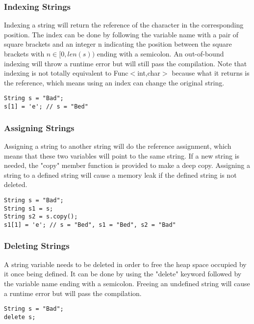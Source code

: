 \subsubsection{Indexing Strings}
Indexing a string will return the reference of the character in the corresponding position. The index can be done by following the variable name with a pair of square brackets and an integer n indicating the position between the square brackets with $n \in [0, len(s))$ ending with a semicolon. An out-of-bound indexing will throw a runtime error but will still pass the compilation. Note that indexing is not totally equivalent to Func$<$int,char$>$ because what it returns is the reference, which means using an index can change the original string.
\begin{lstlisting}[caption={indexing\_string.csm}, captionpos=b]
String s = "Bad";
s[1] = 'e'; // s = "Bed"
\end{lstlisting}
\subsubsection{Assigning Strings}
Assigning a string to another string will do the reference assignment, which means that these two variables will point to the same string. If a new string is needed, the "copy" member function is provided to make a deep copy. Assigning a string to a defined string will cause a memory leak if the defined string is not deleted.
\begin{lstlisting}[caption={assigning\_string.csm}, captionpos=b]
String s = "Bad";
String s1 = s;
String s2 = s.copy();
s1[1] = 'e'; // s = "Bed", s1 = "Bed", s2 = "Bad"
\end{lstlisting}
\subsubsection{Deleting Strings}
A string variable needs to be deleted in order to free the heap space occupied by it once being defined. It can be done by using the "delete" keyword followed by the variable name ending with a semicolon. Freeing an undefined string will cause a runtime error but will pass the compilation.
\begin{lstlisting}[caption={deleting\_string.csm}, captionpos=b]
String s = "Bad";
delete s;
\end{lstlisting}

